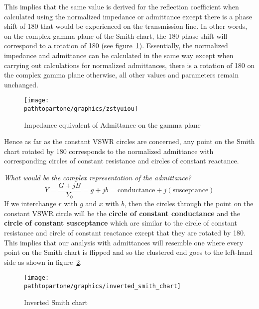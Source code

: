 This implies that the same value is derived for the reflection coefficient when calculated using the normalized impedance or admittance except there is a phase shift of 180\textdegree\; that would be experienced on the transmission line. In other words, on the complex gamma plane of the Smith chart, the 180\textdegree\; phase shift will correspond to a rotation of 180\textdegree\; (see figure~\ref{fig:zstyuiou}). Essentially, the normalized impedance and admittance can be calculated in the same way except when carrying out calculations for normalized admittances, there is a rotation of 180\textdegree\; on the complex gamma plane otherwise, all other values and parameters remain unchanged.
\begin{figure}[h]
\centering
\texttt{[image: \\pathtopartone/graphics/zstyuiou]}
\caption{Impedance equivalent of Admittance on the gamma plane}
\label{fig:zstyuiou}
\end{figure}

Hence as far as the constant VSWR circles are concerned, any point on the Smith chart rotated by 180\textdegree\; corresponds to the normalized admittance with corresponding circles of constant resistance and circles of constant reactance. 

\emph{What would be the complex representation of the admittance?}
\begin{dmath*}
\bar{Y}=\frac{G + jB}{Y_0} = g + jb
= \text{conductance} + j (\text{susceptance})
\end{dmath*}
If we interchange $r$ with $g$ and $x$ with $b$, then the circles through the point on the constant VSWR circle will be the \textbf{circle of constant conductance} and the \textbf{circle of constant susceptance} which are similar to the circle of constant resistance and circle of constant reactance except that they are rotated by 180\textdegree\;. This implies that our analysis with admittances will resemble one where every point on the Smith chart is flipped and so the clustered end goes to the left-hand side as shown in figure~\ref{fig:invertedsmithchart}.
\begin{figure}[h]
\centering
\texttt{[image: \\pathtopartone/graphics/inverted\_smith\_chart]}
\caption{Inverted Smith chart}\label{fig:invertedsmithchart}
\end{figure}

